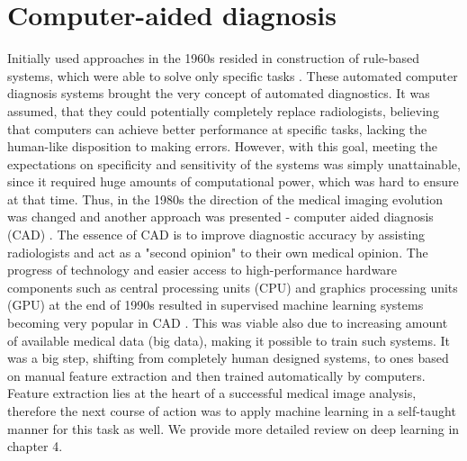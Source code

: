 \section{Computer-aided diagnosis}
Initially used approaches in the 1960s resided in construction of rule-based systems, which were able to solve only specific tasks \cite{surveyOnImageing}. These automated computer diagnosis systems brought the very concept of automated diagnostics. It was assumed, that they could potentially completely replace radiologists, believing that computers can achieve better performance at specific tasks, lacking the human-like disposition to making errors. However, with this goal, meeting the expectations on specificity and sensitivity of the systems was simply unattainable, since it required huge amounts of computational power, which was hard to ensure at that time. Thus, in the 1980s the direction of the medical imaging evolution was changed and another approach was presented - computer aided diagnosis (CAD) \cite{diagnostic50years}. The essence of CAD is to improve diagnostic accuracy by assisting radiologists and act as a "second opinion" \cite{surveyOnImageing, CADinmedicalImaging} to their own medical opinion. 
The progress of technology and easier access to high-performance hardware components such as central processing units (CPU) and graphics processing units (GPU) at the end of 1990s resulted in supervised machine learning systems becoming very popular in CAD \cite{surveyOnImageing}. This was viable also due to increasing amount of available medical data (big data), making it possible to train such systems. It was a big step, shifting from completely human designed systems, to ones based on manual feature extraction and then trained automatically by computers. Feature extraction lies at the heart of a successful medical image analysis, therefore the next course of action was to apply machine learning in a self-taught manner for this task as well. We provide more detailed review on deep learning in chapter 4.



